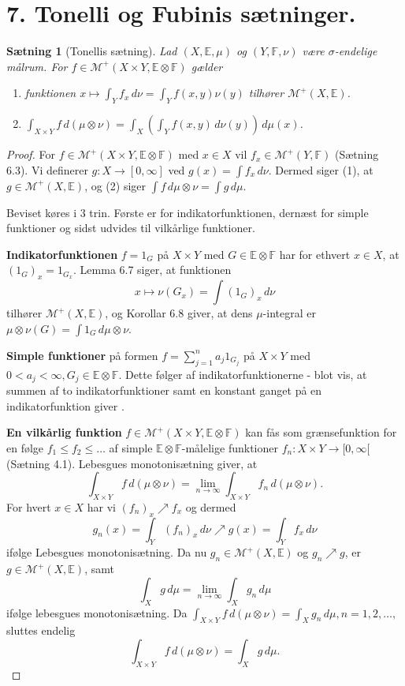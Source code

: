 \documentclass[12pt]{report}
\newtheorem{theorem}[lemma]{Sætning}
\theoremstyle{break}
\newtheorem*{proof}{Bevis}
\theoremstyle{break}
\newcommand{\Int}[1]{\int#1\,d\mu}
\newcommand{\EE}{\mathbb{E}}
\newcommand{\FF}{\mathbb{F}}
\newcommand{\M}{\mathcal{M}^+}
\newcommand{\1}{\mathds{1}}
\begin{document}
\newpage
\section*{7. Tonelli og Fubinis sætninger.}
\begin{theorem}[Tonellis sætning]
Lad $(X,\EE,\mu)$ og $(Y,\FF,\nu)$ være $\sigma$-endelige målrum. For $f\in\M(X\times Y,\EE\otimes\FF)$ gælder
\begin{enumerate}
\item funktionen $x\mapsto\int_Yf_x\,d\nu = \int_Yf(x,y)\nu(y)$ tilhører $\M(X,\EE)$.
\item $\int_{X\times Y}f\,d(\mu\otimes\nu)=\int_X(\int_Yf(x,y)\,d\nu(y))\,d\mu(x)$.
\end{enumerate}
\end{theorem}
\begin{proof}
For $f\in\M(X\times Y,\EE\otimes\FF)$ med $x\in X$ vil $f_x\in\M(Y,\FF)$ (Sætning 6.3). Vi definerer $g\colon X\to[0,\infty]$ ved $g(x)=\int f_x\,d\nu$. Dermed siger (1), at $g\in\M(X,\EE)$, og (2) siger $\int f\,d\mu\otimes\nu=\Int{g}$.

\bigskip

Beviset køres i 3 trin. Første er for indikatorfunktionen, dernæst for simple funktioner og sidst udvides til vilkårlige funktioner.

\bigskip

{\textbf{Indikatorfunktionen}} $f=1_G$ på $X\times Y$ med $G\in\EE\otimes\FF$ har for ethvert $x\in X$, at $(1_G)_x=1_{G_x}$. Lemma 6.7 siger, at funktionen
\[x\mapsto\nu(G_x)=\int(1_G)_x\,d\nu\]
tilhører $\M(X,\EE)$, og Korollar 6.8 giver, at dens $\mu$-integral er $\mu\otimes\nu(G)=\int 1_G\,d\mu\otimes\nu.$

\bigskip

{\textbf{Simple funktioner}} på formen $f=\sum_{j=1}^na_j1_{G_j}$ på $X\times Y$ med $0<a_j<\infty, G_j\in\EE\otimes\FF$. Dette følger af indikatorfunktionerne - blot vis, at summen af to indikatorfunktioner samt en konstant ganget på en indikatorfunktion giver .

\bigskip

{\textbf{En vilkårlig funktion}} $f\in\M(X\times Y,\EE\otimes\FF)$ kan fås som grænsefunktion for en følge $f_1\leq f_2\leq\ldots$ af simple $\EE\otimes\FF$-målelige funktioner $f_n\colon X\times Y\to[0,\infty[$ (Sætning 4.1). Lebesgues monotonisætning giver, at 
\[\int_{X\times Y}f\,d(\mu\otimes\nu)=\lim\limits_{n\to\infty}\int_{X\times Y}f_n\,d(\mu\otimes\nu).\]
For hvert $x\in X$ har vi $(f_n)_x\nearrow f_x$ og dermed
\[g_n(x)=\int_Y(f_n)_x\,d\nu\nearrow g(x)=\int_Y f_x\,d\nu\]
ifølge Lebesgues monotonisætning. Da nu $g_n\in\M(X,\EE)$ og $g_n\nearrow g$, er $g\in\M(X,\EE)$, samt
\[\int_X g\,d\mu = \lim\limits_{n\to\infty}\int_Xg_n\,d\mu\]
ifølge lebesgues monotonisætning. Da $\int_{X\times Y}f\,d(\mu\otimes\nu)=\int_Xg_n\,d\mu, n=1,2,\ldots,$ sluttes endelig
\[\int_{X\times Y}f\,d(\mu\otimes\nu)=\int_X g\,d\mu.\]
\end{proof}
\end{document}
